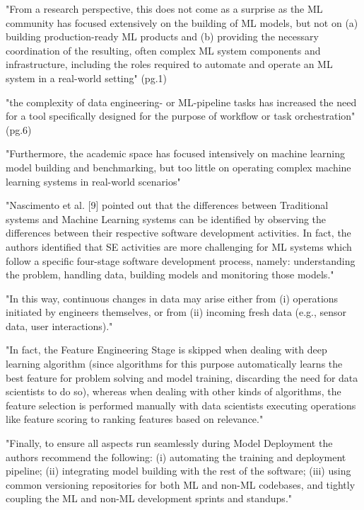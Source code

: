 "From a research perspective, this does not come as a surprise as the ML
community has focused extensively on the building of ML models, but not on
(a) building production-ready ML products and (b) providing the necessary
coordination of the resulting, often complex ML system components and
infrastructure, including the roles required to automate and operate an
ML system in a real-world setting" (pg.1)

"the complexity of data engineering- or ML-pipeline tasks has
increased the need for a tool specifically designed for the
purpose of workflow or task orchestration" (pg.6)

"Furthermore, the academic space has focused intensively on
machine learning model building and benchmarking, but too little
on operating complex machine learning systems in real-world scenarios"


\parencite{Lorenzoni2021MachineReview}

"Nascimento et al. [9] pointed out that the differences between Traditional
systems and Machine Learning systems can be identified by observing the
differences between their respective software development activities. In fact,
the authors identified that SE activities are more challenging for ML systems
which follow a specific four-stage software development process, namely:
understanding the problem, handling data, building models and monitoring those
models."

"In this way, continuous changes in data may arise either from
(i) operations initiated by engineers themselves, or from
(ii) incoming fresh data (e.g., sensor data, user interactions)."

"In fact, the Feature Engineering Stage is skipped when dealing with deep
learning algorithm (since algorithms for this purpose automatically learns the
best feature for problem solving and model training, discarding the need for
data scientists to do so), whereas when dealing with other kinds of algorithms,
the feature selection is performed manually with data scientists executing
operations like feature scoring to ranking features based on relevance."

"Finally, to ensure all aspects run seamlessly during Model Deployment the
authors recommend the following:
(i) automating the training and deployment pipeline;
(ii) integrating model building with the rest of the software;
(iii) using common versioning repositories for both ML and non-ML codebases,
      and tightly coupling the ML and non-ML development sprints and standups."

